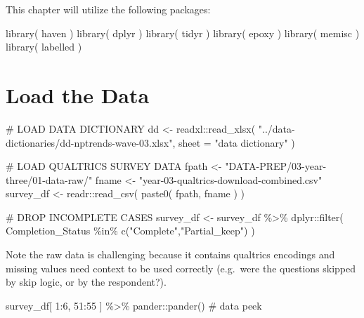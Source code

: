 \documentclass[
  letterpaper,
]{scrbook}
\newenvironment{Shaded}{\begin{snugshade}}{\end{snugshade}}
\newcommand{\AttributeTok}[1]{\textcolor[rgb]{0.40,0.45,0.13}{#1}}
\newcommand{\CommentTok}[1]{\textcolor[rgb]{0.37,0.37,0.37}{#1}}
\newcommand{\DecValTok}[1]{\textcolor[rgb]{0.68,0.00,0.00}{#1}}
\newcommand{\FunctionTok}[1]{\textcolor[rgb]{0.28,0.35,0.67}{#1}}
\newcommand{\NormalTok}[1]{\textcolor[rgb]{0.00,0.23,0.31}{#1}}
\newcommand{\OtherTok}[1]{\textcolor[rgb]{0.00,0.23,0.31}{#1}}
\newcommand{\SpecialCharTok}[1]{\textcolor[rgb]{0.37,0.37,0.37}{#1}}
\newcommand{\StringTok}[1]{\textcolor[rgb]{0.13,0.47,0.30}{#1}}
\begin{document}
This chapter will utilize the following packages:

\begin{Shaded}
\begin{Highlighting}[]
\FunctionTok{library}\NormalTok{( haven )}
\FunctionTok{library}\NormalTok{( dplyr )}
\FunctionTok{library}\NormalTok{( tidyr )}
\FunctionTok{library}\NormalTok{( epoxy )}
\FunctionTok{library}\NormalTok{( memisc )}
\FunctionTok{library}\NormalTok{( labelled )}
\end{Highlighting}
\end{Shaded}

\part{Load the Data}

\begin{Shaded}
\begin{Highlighting}[]
\CommentTok{\# LOAD DATA DICTIONARY }
\NormalTok{dd }\OtherTok{\textless{}{-}} 
\NormalTok{  readxl}\SpecialCharTok{::}\FunctionTok{read\_xlsx}\NormalTok{( }
   \StringTok{"../data{-}dictionaries/dd{-}nptrends{-}wave{-}03.xlsx"}\NormalTok{, }
   \AttributeTok{sheet =} \StringTok{"data dictionary"}\NormalTok{ )}

\CommentTok{\# LOAD QUALTRICS SURVEY DATA }
\NormalTok{fpath }\OtherTok{\textless{}{-}} \StringTok{"DATA{-}PREP/03{-}year{-}three/01{-}data{-}raw/"}
\NormalTok{fname }\OtherTok{\textless{}{-}} \StringTok{"year{-}03{-}qualtrics{-}download{-}combined.csv"}
\NormalTok{survey\_df  }\OtherTok{\textless{}{-}}\NormalTok{ readr}\SpecialCharTok{::}\FunctionTok{read\_csv}\NormalTok{( }\FunctionTok{paste0}\NormalTok{( fpath, fname ) )}

\CommentTok{\# DROP INCOMPLETE CASES}
\NormalTok{survey\_df }\OtherTok{\textless{}{-}} 
\NormalTok{  survey\_df }\SpecialCharTok{\%\textgreater{}\%} 
\NormalTok{  dplyr}\SpecialCharTok{::}\FunctionTok{filter}\NormalTok{( Completion\_Status }\SpecialCharTok{\%in\%} \FunctionTok{c}\NormalTok{(}\StringTok{"Complete"}\NormalTok{,}\StringTok{"Partial\_keep"}\NormalTok{) )}
\end{Highlighting}
\end{Shaded}

Note the raw data is challenging because it contains qualtrics encodings
and missing values need context to be used correctly (e.g.~were the
questions skipped by skip logic, or by the respondent?).

\begin{Shaded}
\begin{Highlighting}[]
\NormalTok{survey\_df[ }\DecValTok{1}\SpecialCharTok{:}\DecValTok{6}\NormalTok{, }\DecValTok{51}\SpecialCharTok{:}\DecValTok{55}\NormalTok{ ] }\SpecialCharTok{\%\textgreater{}\%}\NormalTok{ pander}\SpecialCharTok{::}\FunctionTok{pander}\NormalTok{()   }\CommentTok{\# data peek}
\end{Highlighting}
\end{Shaded}
\end{document}
